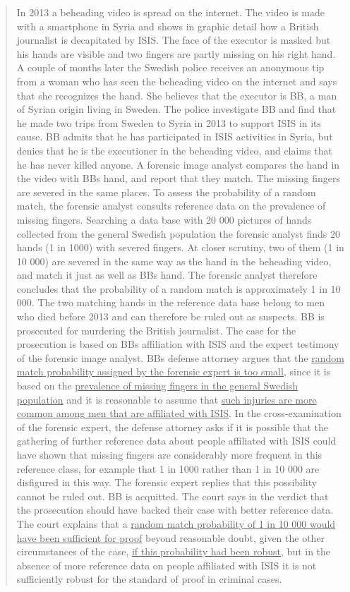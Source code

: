 \documentclass[
  10pt,
  dvipsnames,enabledeprecatedfontcommands]{scrartcl}
\begin{document}
\begin{quote}
In 2013 a beheading video is spread on the internet. The video is made with a smartphone in
Syria and shows in graphic detail how a British journalist is decapitated by ISIS. The face of the
executor is masked but his hands are visible and two fingers are partly missing on his right
hand. A couple of months later the Swedish police receives an anonymous tip from a woman
who has seen the beheading video on the internet and says that she recognizes the hand. She
believes that the executor is BB, a man of Syrian origin living in Sweden. The police investigate
BB and find that he made two trips from Sweden to Syria in 2013 to support ISIS in its cause.
BB admits that he has participated in ISIS activities in Syria, but denies that he is the
executioner in the beheading video, and claims that he has never killed anyone. A forensic
image analyst compares the hand in the video with BBs hand, and report that they match. The
missing fingers are severed in the same places. To assess the probability of a random match,
the forensic analyst consults reference data on the prevalence of missing fingers. Searching a
data base with 20 000 pictures of hands collected from the general Swedish population the
forensic analyst finds 20 hands (1 in 1000) with severed fingers. At closer scrutiny, two of them
(1 in 10 000) are severed in the same way as the hand in the beheading video, and match it
just as well as BBs hand. The forensic analyst therefore concludes that the probability of a
random match is approximately 1 in 10 000.  The two matching hands in the reference data
base belong to men who died before 2013 and can therefore be ruled out as suspects. BB is
prosecuted for murdering the British journalist. The case for the prosecution is based on BBs
affiliation with ISIS and the expert testimony of the forensic image analyst. BBs defense
attorney argues that the \underline{random match probability assigned by the forensic expert is too
small}, since it is based on the \underline{prevalence of missing fingers in the general Swedish population}
and it is reasonable to assume that \underline{such injuries are more common among men that are
affiliated with ISIS}. In the cross-examination of the forensic expert, the defense attorney asks if
it is possible that the gathering of further reference data about people affiliated with ISIS could
have shown that missing fingers are considerably more frequent in this reference class, for
example that 1 in 1000 rather than 1 in 10 000 are disfigured in this way. The forensic expert
replies that this possibility cannot be ruled out. BB is acquitted. The court says in the verdict
that the prosecution should have backed their case with better reference data. The court
explains that a \underline{random match probability of 1 in 10 000 would have been sufficient for proof}
beyond reasonable doubt, given the other circumstances of the case, \underline{if this probability had
been robust}, but in the absence of more reference data on people affiliated with ISIS it is not
sufficiently robust for the standard of proof in criminal cases. 
\end{quote}
\end{document}
